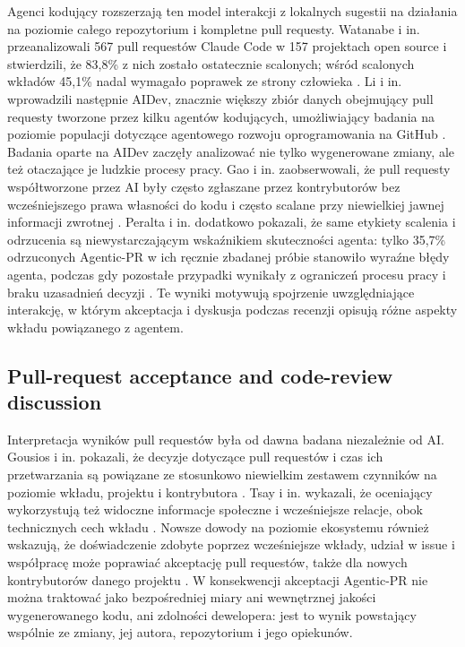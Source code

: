 Agenci kodujący rozszerzają ten model interakcji z lokalnych sugestii na działania na poziomie całego repozytorium i kompletne pull requesty. Watanabe i in. przeanalizowali 567 pull requestów Claude Code w 157 projektach open source i stwierdzili, że 83,8\% z nich zostało ostatecznie scalonych; wśród scalonych wkładów 45,1\% nadal wymagało poprawek ze strony człowieka \cite{watanabe2025agentic}. Li i in. wprowadzili następnie AIDev, znacznie większy zbiór danych obejmujący pull requesty tworzone przez kilku agentów kodujących, umożliwiający badania na poziomie populacji dotyczące agentowego rozwoju oprogramowania na GitHub \cite{li2026aidev}. Badania oparte na AIDev zaczęły analizować nie tylko wygenerowane zmiany, ale też otaczające je ludzkie procesy pracy. Gao i in. zaobserwowali, że pull requesty współtworzone przez AI były często zgłaszane przez kontrybutorów bez wcześniejszego prawa własności do kodu i często scalane przy niewielkiej jawnej informacji zwrotnej \cite{gao2026autopilot}. Peralta i in. dodatkowo pokazali, że same etykiety scalenia i odrzucenia są niewystarczającym wskaźnikiem skuteczności agenta: tylko 35,7\% odrzuconych Agentic-PR w ich ręcznie zbadanej próbie stanowiło wyraźne błędy agenta, podczas gdy pozostałe przypadki wynikały z ograniczeń procesu pracy i braku uzasadnień decyzji \cite{peralta2026decisions}. Te wyniki motywują spojrzenie uwzględniające interakcję, w którym akceptacja i dyskusja podczas recenzji opisują różne aspekty wkładu powiązanego z agentem.

\subsection{Pull-request acceptance and code-review discussion}
Interpretacja wyników pull requestów była od dawna badana niezależnie od AI. Gousios i in. pokazali, że decyzje dotyczące pull requestów i czas ich przetwarzania są powiązane ze stosunkowo niewielkim zestawem czynników na poziomie wkładu, projektu i kontrybutora \cite{gousios2014pull}. Tsay i in. wykazali, że oceniający wykorzystują też widoczne informacje społeczne i wcześniejsze relacje, obok technicznych cech wkładu \cite{tsay2014influence}. Nowsze dowody na poziomie ekosystemu również wskazują, że doświadczenie zdobyte poprzez wcześniejsze wkłady, udział w issue i współpracę może poprawiać akceptację pull requestów, także dla nowych kontrybutorów danego projektu \cite{meijer2025ecosystem}. W konsekwencji akceptacji Agentic-PR nie można traktować jako bezpośredniej miary ani wewnętrznej jakości wygenerowanego kodu, ani zdolności dewelopera: jest to wynik powstający wspólnie ze zmiany, jej autora, repozytorium i jego opiekunów.

